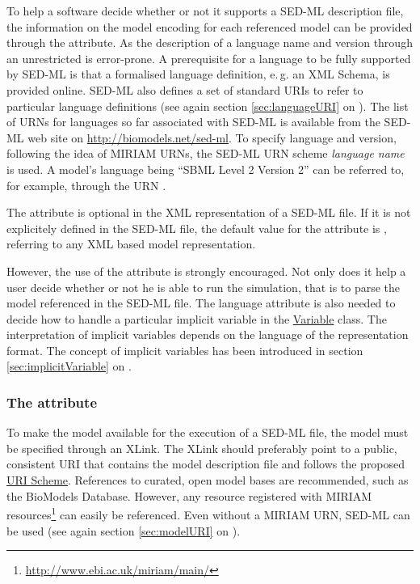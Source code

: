 To help a software decide whether or not it supports a SED-ML description file, the information on the model encoding for each referenced model can be provided through the  attribute. 
As the description of a language name and version through an unrestricted  is error-prone. 
A prerequisite for a language to be fully supported by SED-ML is that a formalised language definition, e.\,g. an XML Schema, is provided online. SED-ML also defines a set of standard URIs to refer to particular language definitions (see again section \ref{sec:languageURI} on ). 
The list of URNs for languages so far associated with SED-ML is available from the SED-ML web site on \url{http://biomodels.net/sed-ml}. 
To specify language and version, following the idea of MIRIAM URNs, the SED-ML URN scheme \emph{language name} is used. A model's language being ``SBML Level 2 Version 2'' can be referred to, for example, through the URN .

The  attribute is optional in the XML representation of a SED-ML file. 
If it is not explicitely defined in the SED-ML file, the default value for the  attribute is , referring to any XML based model representation. 

However, the use of the  attribute is strongly encouraged. Not only does it help a user decide whether or not he is able to run the simulation, that is to parse the model referenced in the SED-ML file. The language attribute is also needed to decide how to handle a particular implicit variable in the \hyperref[class:variable]{Variable} class. The interpretation of implicit variables depends on the language of the representation format. The concept of implicit variables has been introduced in section \ref{sec:implicitVariable} on  .


\subsubsection{The  attribute}
\label{sec:source}
To make the model available for the execution of a SED-ML file, the model  must be specified through an XLink. 
The XLink should preferably point to a public, consistent URI that contains the model description file and follows the proposed \hyperref[sec:uriScheme]{URI Scheme}.
References to curated, open model bases are recommended, such as the BioModels Database. However, any resource registered with MIRIAM resources\footnote{\url{http://www.ebi.ac.uk/miriam/main/}} can easily be referenced. Even without a MIRIAM URN, SED-ML can be used (see again section \ref{sec:modelURI} on ).

